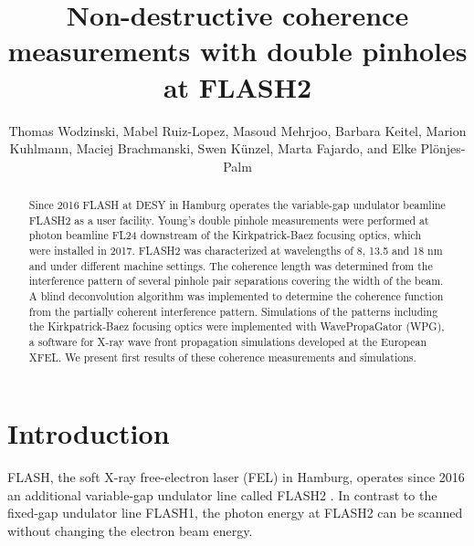 \documentclass{osa-article}
\begin{document}
\title{Non-destructive coherence measurements with double pinholes at FLASH2}

\author{Thomas Wodzinski, Mabel Ruiz-Lopez, Masoud Mehrjoo, Barbara Keitel, Marion Kuhlmann, Maciej Brachmanski, Swen K\"{u}nzel, Marta Fajardo, and Elke Pl\"{o}njes-Palm}

\address{GoLP/Instituto de Plasmas e Fus\~{a}o Nuclear, Instituto Superior T\'{e}cnico, 1049-001 Lisboa, Portugal\\
Deutsches Elektronen-Synchrotron DESY, Notkestrasse 85, 22607 Hamburg, Germany}




\begin{abstract}

Since 2016 FLASH at DESY in Hamburg operates the variable-gap undulator beamline FLASH2 as a user facility. Young's double pinhole measurements were performed at photon beamline FL24 downstream of the Kirkpatrick-Baez focusing optics, which were installed in 2017. FLASH2 was characterized at wavelengths of 8, 13.5 and 18 nm and under different machine settings. The coherence length was determined from the interference pattern of several pinhole pair separations covering the width of the beam. A blind deconvolution algorithm was implemented to determine the coherence function from the partially coherent interference pattern. Simulations of the patterns including the Kirkpatrick-Baez focusing optics were implemented with WavePropaGator (WPG), a software for X-ray wave front propagation simulations developed at the European XFEL. We present first results of these coherence measurements and simulations.
\end{abstract}


\section{Introduction}

FLASH, the soft X-ray free-electron laser (FEL) in Hamburg, operates since 2016 an additional variable-gap undulator line called FLASH2 \cite{Ploenjes2016}. In contrast to the fixed-gap undulator line FLASH1, the photon energy at FLASH2 can be scanned without changing the electron beam energy.
\end{document}
